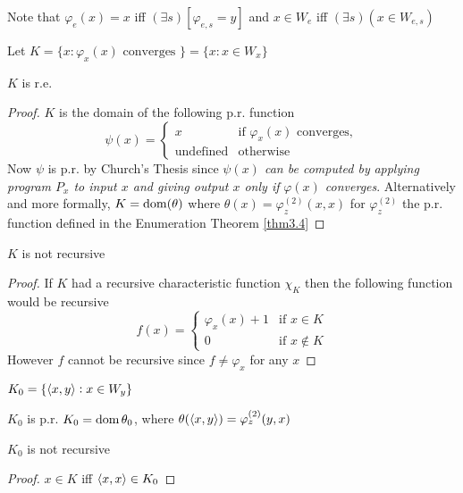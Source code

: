 \documentclass[11pt]{article}
\begin{document}
Note that \(\varphi_e(x)=x\) iff \((\exists s)[\varphi_{e,s}=y]\) and 
\(x\in W_e\) iff \((\exists s)(x\in W_{e,s})\)

\begin{definition}[]
Let \(K=\{x:\varphi_x(x)\text{ converges }\}=\{x:x\in W_x\}\)
\end{definition}
\begin{proposition}[]
\(K\) is r.e.
\end{proposition}
\begin{proof}
\(K\) is the domain of the following p.r. function
\begin{equation*}
\psi(x)=
\begin{cases}
x&\text{if } \varphi_x(x)\text{ converges},\\
\text{undefined}&\text{otherwise}
\end{cases}
\end{equation*}
Now \(\psi\) is p.r. by Church's Thesis since \emph{\(\psi(x)\) can be computed by}
\emph{applying program \(P_x\) to input \(x\) and giving output \(x\) only if}
\emph{\(\varphi(x)\) converges}. Alternatively and more formally,
\(K=\operatorname{dom}(\theta)\) where \(\theta(x)=\varphi_z^{(2)}(x,x)\) for \(\varphi_z^{(2)}\)
the p.r. function defined in the Enumeration Theorem \ref{thm3.4}
\end{proof}
\begin{corollary}[]
\label{col1}
\(K\) is not recursive
\end{corollary}
\begin{proof}
If \(K\) had a recursive characteristic function \(\chi_K\) then the following
function would be recursive
\begin{equation*}
f(x)=
\begin{cases}
\varphi_x(x)+1&\text{if }x\in K\\
0&\text{if }x\not\in K
\end{cases}
\end{equation*}
However \(f\) cannot be recursive since \(f\neq\varphi_x\) for any \(x\)
\end{proof}
\begin{definition}[]
\(K_0=\{\langle x,y\rangle:x\in W_y\}\)
\end{definition}
\(K_0\) is p.r. \(K_0=\operatorname{dom}\theta_0\), where
\(\theta(\langle x,y\rangle)=\varphi^{(2)}_z(y,x)\)

\begin{corollary}[]
\label{cor4.6}
\(K_0\) is not recursive
\end{corollary}
\begin{proof}
\(x\in K\) iff \(\langle x,x\rangle\in K_0\)
\end{proof}
\end{document}
